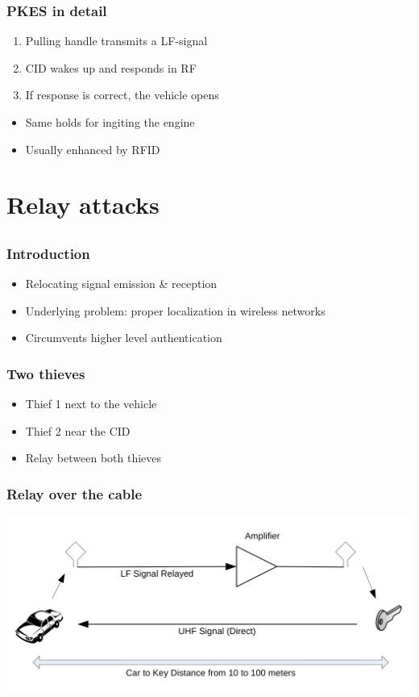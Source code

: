 \documentclass[12pt]{beamer}
\begin{document}
	\begin{frame}
		\frametitle{PKES in detail}
		\begin{enumerate}
			\item Pulling handle transmits a LF-signal
			\item CID wakes up and responds in RF
			\item If response is correct, the vehicle opens
		\end{enumerate}
		\begin{itemize}
			\item Same holds for ingiting the engine
			\item Usually enhanced by RFID
		\end{itemize}
	\end{frame}

\section{Relay attacks}
\subsection*{}
	\begin{frame}
	\frametitle{Introduction}
		\begin{itemize}
			\item Relocating signal emission \& reception
			\item Underlying problem: proper localization in wireless networks
			\item Circumvents higher level authentication
		\end{itemize}
	\end{frame}

	\begin{frame}
		\frametitle{Two thieves}
		\begin{itemize}
			\item Thief 1 next to the vehicle
			\item Thief 2 near the CID
			\item Relay between both thieves
		\end{itemize}
	\end{frame}
	
	\begin{frame}
	\frametitle{Relay over the cable}
		\begin{center}
			\includegraphics[scale=0.85]{img/franc_relay_over_the_wire.png} 
		\end{center}
	\end{frame}
	
\end{document}
